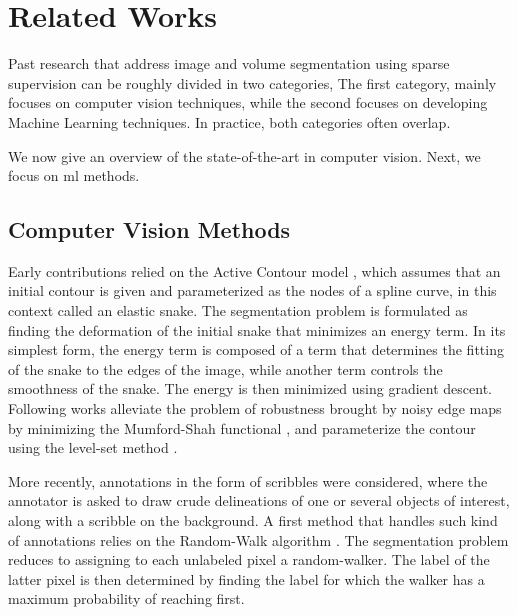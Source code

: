 \section{Related Works}

Past research that address image and volume segmentation using sparse supervision can be roughly divided in two categories,
The first category, mainly focuses on computer vision techniques, while the second focuses on developing Machine Learning techniques.
In practice, both categories often overlap.

We now give an overview of the state-of-the-art in computer vision.
Next, we focus on \gls{ml} methods.


\subsection{Computer Vision Methods}

Early contributions relied on the Active Contour model \cite{kass88}, which assumes that an initial contour is given and parameterized as the nodes of a spline curve, in this context called an elastic snake.
The segmentation problem is formulated as finding the deformation of the initial snake that minimizes an energy term.
In its simplest form, the energy term is composed of a term that determines the fitting of the snake to the edges of the image, while another term controls the smoothness of the snake.
The energy is then minimized using gradient descent.
Following works alleviate the problem of robustness brought by noisy edge maps by minimizing the Mumford-Shah functional \cite{chan01}, and parameterize the contour using the level-set method \cite{osher88}.

More recently, annotations in the form of scribbles were considered, where the annotator is asked to draw crude delineations of one or several objects of interest, along with a scribble on the background.
A first method that handles such kind of annotations relies on the Random-Walk algorithm \cite{grady06}.
The segmentation problem reduces to assigning to each unlabeled pixel a random-walker. The label of the latter pixel is then determined by finding the label for which the walker has a maximum probability of reaching first.

